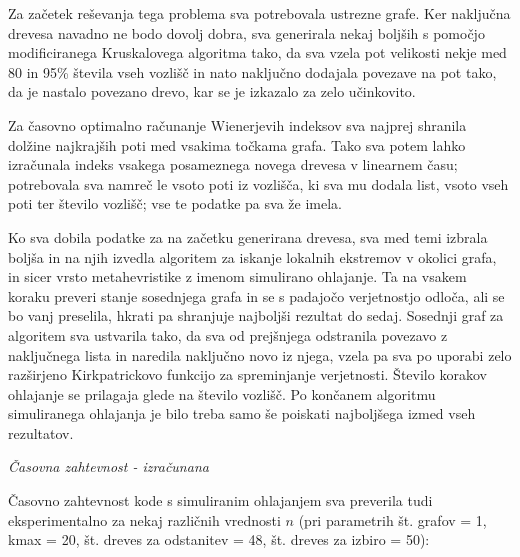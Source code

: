 \documentclass[a4paper, 12 pt]{article}
\begin{document}
Za začetek reševanja tega problema sva potrebovala ustrezne grafe. Ker naključna drevesa navadno ne bodo dovolj dobra, sva generirala nekaj boljših s pomočjo modificiranega Kruskalovega algoritma tako, da sva vzela pot velikosti nekje med 80 in 95\% števila vseh vozlišč in nato naključno dodajala povezave na pot tako, da je nastalo povezano drevo, kar se je izkazalo za zelo učinkovito.
\vspace{0.5cm}

Za časovno optimalno računanje Wienerjevih indeksov sva najprej shranila dolžine najkrajših poti med vsakima točkama grafa. Tako sva potem lahko izračunala indeks vsakega posameznega novega drevesa v linearnem času; potrebovala sva namreč le vsoto poti iz vozlišča, ki sva mu dodala list, vsoto vseh poti ter število vozlišč; vse te podatke pa sva že imela.
\vspace{0.5cm}

 Ko sva dobila podatke za na začetku generirana drevesa, sva med temi izbrala boljša in na njih izvedla algoritem za iskanje lokalnih ekstremov v okolici grafa, in sicer vrsto metahevristike z imenom simulirano ohlajanje. Ta na vsakem koraku preveri stanje sosednjega grafa in se s padajočo verjetnostjo odloča, ali se bo vanj preselila, hkrati pa shranjuje najboljši rezultat do sedaj. Sosednji graf za algoritem sva ustvarila tako, da sva od prejšnjega odstranila povezavo z naključnega lista in naredila naključno novo iz njega, vzela pa sva po uporabi zelo razširjeno Kirkpatrickovo funkcijo za spreminjanje verjetnosti. Število korakov ohlajanje se prilagaja glede na število vozlišč. Po končanem algoritmu simuliranega ohlajanja je bilo treba samo še poiskati najboljšega izmed vseh rezultatov.
\vspace{0.5cm}

\vspace{1cm}

\textit{Časovna zahtevnost - izračunana}

\vspace{1cm}

Časovno zahtevnost kode s simuliranim ohlajanjem sva preverila tudi eksperimentalno za nekaj različnih vrednosti $n$ (pri parametrih št. grafov = 1, kmax = 20, št. dreves za odstanitev = 48, št. dreves za izbiro = 50):
\end{document}
